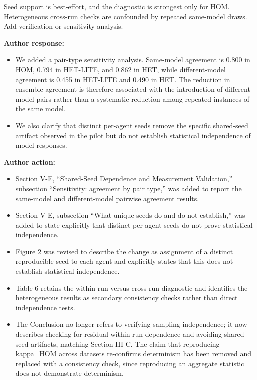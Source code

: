 \documentclass[11pt]{article}
\newcommand{\rvcomment}[1]{{\color{ReviewerGreen}#1}}
\begin{document}
\rvcomment{Seed support is best-effort, and the diagnostic is strongest only for HOM. Heterogeneous cross-run checks are confounded by repeated same-model draws. Add verification or sensitivity analysis.}

\textbf{Author response:}

\begin{itemize}

\item We added a pair-type sensitivity analysis. Same-model agreement is 0.800 in HOM, 0.794 in HET-LITE, and 0.862 in HET, while different-model agreement is 0.455 in HET-LITE and 0.490 in HET. The reduction in ensemble agreement is therefore associated with the introduction of different-model pairs rather than a systematic reduction among repeated instances of the same model.

\item We also clarify that distinct per-agent seeds remove the specific shared-seed artifact observed in the pilot but do not establish statistical independence of model responses.

\end{itemize}

\textbf{Author action:}

\begin{itemize}

\item Section V-E, ``Shared-Seed Dependence and Measurement Validation,'' subsection ``Sensitivity: agreement by pair type,'' was added to report the same-model and different-model pairwise agreement results.

\item Section V-E, subsection ``What unique seeds do and do not establish,'' was added to state explicitly that distinct per-agent seeds do not prove statistical independence.

\item Figure 2 was revised to describe the change as assignment of a distinct reproducible seed to each agent and explicitly states that this does not establish statistical independence.

\item Table 6 retains the within-run versus cross-run diagnostic and identifies the heterogeneous results as secondary consistency checks rather than direct independence tests.

\item The Conclusion no longer refers to verifying sampling independence; it now describes checking for residual within-run dependence and avoiding shared-seed artifacts, matching Section III-C. The claim that reproducing kappa\_HOM across datasets re-confirms determinism has been removed and replaced with a consistency check, since reproducing an aggregate statistic does not demonstrate determinism.

\end{itemize}
\end{document}
